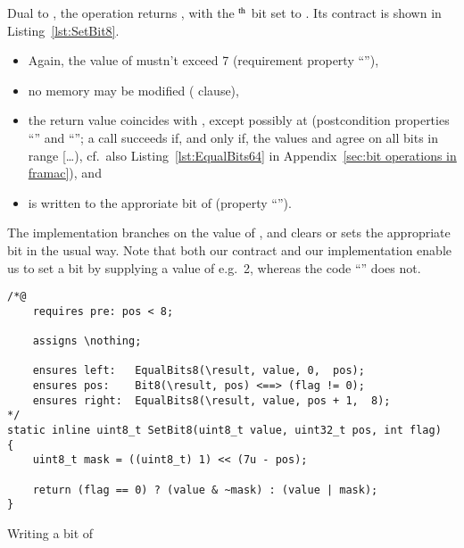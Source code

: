 Dual to , the operation
returns , 
with the $^{\mbox{\scriptsize th}}$ bit
set to .
%
Its contract is shown in Listing~\ref{lst:SetBit8}.
%
\begin{itemize}
\item Again, the value of  mustn't exceed 7 
	(requirement property ``''),
\item no memory may be modified ( clause),
\item the return value coincides with , except possibly
	at  (postcondition properties ``'' 
	and ``''; a call
	 succeeds if, and
	only if, the  values  and
	 agree on all bits in range
	[\ldots{}), cf.\ also
	Listing~\ref{lst:EqualBits64} in 
	Appendix~\ref{sec:bit operations in framac}), and 
\item {} is written to the approriate bit of 
	 (property ``'').
\end{itemize}
%
The implementation branches on the value of , and
clears or sets the
appropriate bit in the usual way.
%
Note that both our contract and our implementation enable us to set
a bit by supplying a
 value of e.g.\ 2, whereas the code 
``'' does not.





\begin{listing}[hbt]
\begin{minipage}{0.99\textwidth}
\begin{lstlisting}[style=acsl-block]
/*@
    requires pre: pos < 8;

    assigns \nothing;

    ensures left:   EqualBits8(\result, value, 0,  pos);
    ensures pos:    Bit8(\result, pos) <==> (flag != 0);
    ensures right:  EqualBits8(\result, value, pos + 1,  8);
*/
static inline uint8_t SetBit8(uint8_t value, uint32_t pos, int flag)
{
    uint8_t mask = ((uint8_t) 1) << (7u - pos);

    return (flag == 0) ? (value & ~mask) : (value | mask);
}
\end{lstlisting}
\end{minipage}
\caption{\label{lst:SetBit8}Writing a bit of }
\end{listing}





















